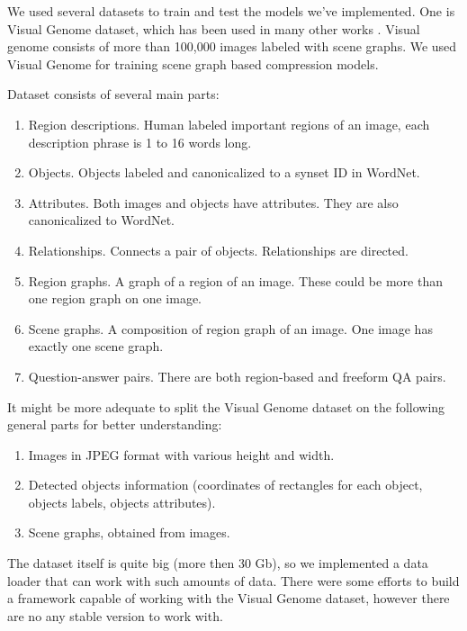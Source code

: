 We used several datasets to train and test the models we've implemented. One is Visual Genome dataset, which has been used in many other works \cite{Krishna_Zhu_Groth_Johnson_Hata_Kravitz_Chen_Kalantidis_Li_Shamma_etal_2016}. Visual genome consists of more than 100,000 images labeled with scene graphs. We used Visual Genome for training scene graph based compression models.

Dataset consists of several main parts:

\begin{enumerate}
    \item Region descriptions. Human labeled important regions of an image, each description phrase is 1 to 16 words long.
    \item Objects. Objects labeled and canonicalized to a synset ID in WordNet.
    \item Attributes. Both images and objects have attributes. They are also canonicalized to WordNet.
    \item Relationships. Connects a pair of objects. Relationships are directed.
    \item Region graphs. A graph of a region of an image. These could be more than one region graph on one image.
    \item Scene graphs. A composition of region graph of an image. One image has exactly one scene graph.
    \item Question-answer pairs. There are both region-based and freeform QA pairs.
\end{enumerate}

It might be more adequate to split the Visual Genome dataset on the following general parts for better understanding:

\begin{enumerate}
    \item Images in JPEG format with various height and width.
    \item Detected objects information (coordinates of rectangles for each object, objects labels, objects attributes).
    \item Scene graphs, obtained from images.
\end{enumerate}

The dataset itself is quite big (more then 30 Gb), so we implemented a data loader that can work with such amounts of data. There were some efforts \cite{Yang_2018_Graph} to build a framework capable of working with the Visual Genome dataset, however there are no any stable version to work with.

